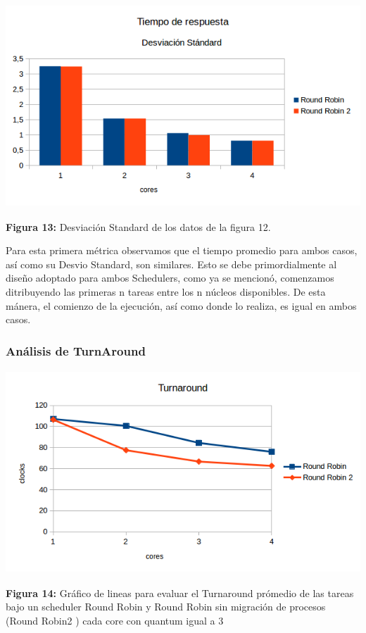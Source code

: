 \documentclass[a4paper]{article}
\begin{document}
\includegraphics[width=\textwidth,height=3.0in,keepaspectratio
]{imagenes/ej8/trds.png} \\
\begin {flushleft}
\textbf{Figura 13:} Desviación Standard de los datos de la figura 12.
\end{flushleft}	

Para esta primera métrica observamos que el tiempo promedio para ambos casos, así como su Desvio Standard, son similares. Esto se debe primordialmente al diseño adoptado para ambos Schedulers, como ya se mencionó, comenzamos ditribuyendo las primeras n tareas entre los n núcleos disponibles. De esta mánera, el comienzo de la ejecución, así como donde lo realiza, es igual en ambos casos.   


\subsubsection*{An\'alisis de TurnAround}


\includegraphics[width=\textwidth,height=3.0in,keepaspectratio
]{imagenes/ej8/ta.png} \\
\begin {flushleft}
\textbf{Figura 14:} Gráfico de lineas para evaluar el Turnaround prómedio de las tareas bajo un scheduler Round Robin y Round Robin sin migración de procesos (Round Robin2 ) cada core con quantum igual a 3
\end{flushleft}	
\end{document}
